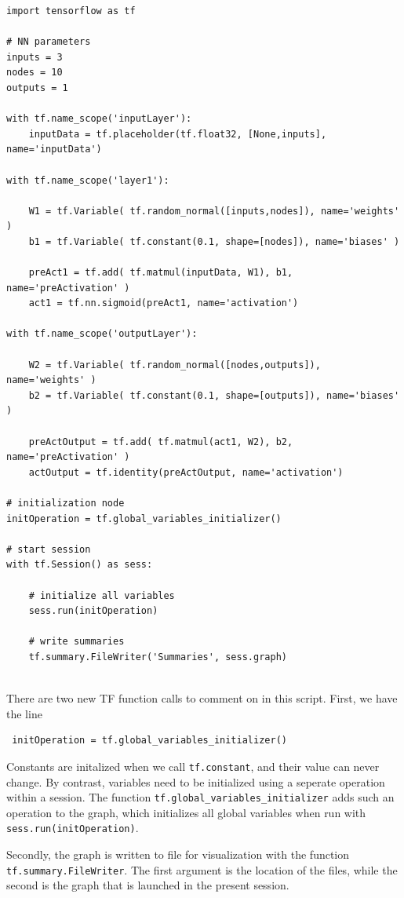\documentclass[twoside,english]{uiofysmaster}
\begin{document}
\begin{verbatim}
import tensorflow as tf

# NN parameters
inputs = 3
nodes = 10
outputs = 1

with tf.name_scope('inputLayer'):
    inputData = tf.placeholder(tf.float32, [None,inputs], name='inputData')

with tf.name_scope('layer1'):
    
    W1 = tf.Variable( tf.random_normal([inputs,nodes]), name='weights' )
    b1 = tf.Variable( tf.constant(0.1, shape=[nodes]), name='biases' )
 
    preAct1 = tf.add( tf.matmul(inputData, W1), b1, name='preActivation' ) 
    act1 = tf.nn.sigmoid(preAct1, name='activation')

with tf.name_scope('outputLayer'):
    
    W2 = tf.Variable( tf.random_normal([nodes,outputs]), name='weights' )
    b2 = tf.Variable( tf.constant(0.1, shape=[outputs]), name='biases' )

    preActOutput = tf.add( tf.matmul(act1, W2), b2, name='preActivation' ) 
    actOutput = tf.identity(preActOutput, name='activation')
    
# initialization node
initOperation = tf.global_variables_initializer()

# start session
with tf.Session() as sess:
    
    # initialize all variables
    sess.run(initOperation)
    
    # write summaries
    tf.summary.FileWriter('Summaries', sess.graph)
 
\end{verbatim}
There are two new TF function calls to comment on in this script. First, we have the line
\begin{verbatim}
 initOperation = tf.global_variables_initializer()
\end{verbatim}
Constants are initalized when we call \texttt{tf.constant}, and their value can never change. 
By contrast, variables need to be initialized using a seperate operation within a session. 
The function \texttt{tf.global\_variables\_initializer} adds such an operation to the graph, which initializes
all global variables when run with \texttt{sess.run(initOperation)}. 

Secondly, the graph is written to file for visualization with the function \texttt{tf.summary.FileWriter}. 
The first argument is the location of the files, while the second is the graph that is launched in the
present session. 
\end{document}

